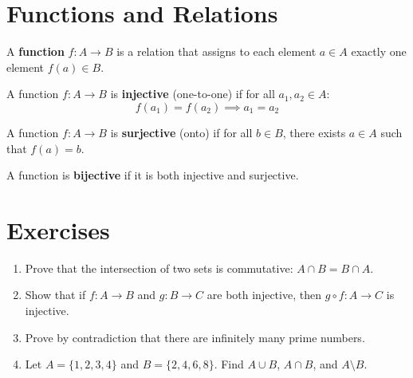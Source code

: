 \section{Functions and Relations}

\begin{definition}[Function]
A \textbf{function} $f: A \to B$ is a relation that assigns to each element $a \in A$ exactly one element $f(a) \in B$.
\end{definition}

\begin{definition}
A function $f: A \to B$ is \textbf{injective} (one-to-one) if for all $a_1, a_2 \in A$:
\[f(a_1) = f(a_2) \implies a_1 = a_2\]
\end{definition}

\begin{definition}
A function $f: A \to B$ is \textbf{surjective} (onto) if for all $b \in B$, there exists $a \in A$ such that $f(a) = b$.
\end{definition}

\begin{definition}
A function is \textbf{bijective} if it is both injective and surjective.
\end{definition}

\section{Exercises}

\begin{enumerate}
    \item Prove that the intersection of two sets is commutative: $A \cap B = B \cap A$.
    
    \item Show that if $f: A \to B$ and $g: B \to C$ are both injective, then $g \circ f: A \to C$ is injective.
    
    \item Prove by contradiction that there are infinitely many prime numbers.
    
    \item Let $A = \{1, 2, 3, 4\}$ and $B = \{2, 4, 6, 8\}$. Find $A \cup B$, $A \cap B$, and $A \setminus B$.
\end{enumerate}
